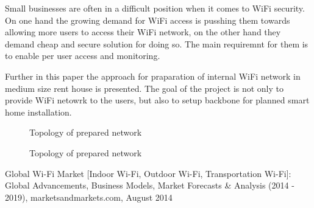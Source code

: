\documentclass{llncs}
\begin{document}
Small businesses are often in a difficult position when it comes to WiFi
security. On one hand the growing demand for WiFi access is pusshing them
towards allowing more users to access their WiFi network, on the other hand they
demand cheap and secure solution for doing so. The main requiremnt for them is
to enable per user access and monitoring. 

Further in this paper the approach for praparation of internal WiFi network in
medium size rent house is presented. The goal of the project is not only to
provide WiFi netowrk to the users, but also to setup backbone for planned
smart home installation.

\begin{figure}
\vspace{-15pt}
\caption{Topology of prepared network}
\end{figure}

\begin{figure}
\vspace{-15pt}
\caption{Topology of prepared network}
\end{figure}

%
%
\begin{thebibliography}{}
%
Global Wi-Fi Market [Indoor Wi-Fi, Outdoor Wi-Fi, Transportation Wi-Fi]: Global
Advancements, Business Models, Market Forecasts \& Analysis (2014 - 2019), 
marketsandmarkets.com,
August 2014
\end{thebibliography}

\clearpage
{} %
\renewcommand{\indexname}{Author Index}
\printindex
\clearpage
{} %
\renewcommand{\indexname}{Subject Index}

\end{document}
